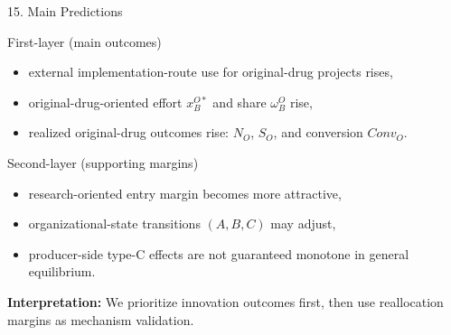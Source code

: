 \documentclass[aspectratio=169,11pt]{beamer}
\begin{document}
\begin{frame}{15. Main Predictions}
\begin{block}{First-layer (main outcomes)}
\begin{itemize}
    \item external implementation-route use for original-drug projects rises,
    \item original-drug-oriented effort \(x_B^{O*}\) and share \(\omega_B^O\) rise,
    \item realized original-drug outcomes rise: \(N_O\), \(S_O\), and conversion \(Conv_O\).
\end{itemize}
\end{block}

\begin{block}{Second-layer (supporting margins)}
\begin{itemize}
    \item research-oriented entry margin becomes more attractive,
    \item organizational-state transitions \((A,B,C)\) may adjust,
    \item producer-side type-C effects are not guaranteed monotone in general equilibrium.
\end{itemize}
\end{block}
\vspace{0.1cm}
\textbf{Interpretation:} We prioritize innovation outcomes first, then use reallocation margins as mechanism validation.
\end{frame}
\end{document}
